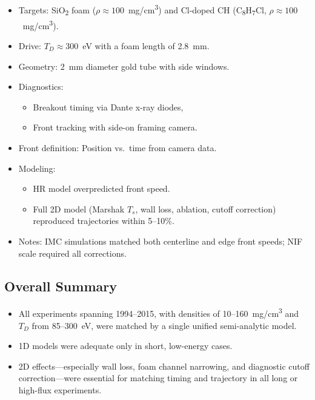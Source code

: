 \documentclass{article}
\begin{document}
\begin{itemize}
    \item Targets: SiO\textsubscript{2} foam ($\rho \approx 100$~mg/cm\textsuperscript{3}) and Cl-doped CH (C\textsubscript{8}H\textsubscript{7}Cl, $\rho \approx 100$~mg/cm\textsuperscript{3}).
    \item Drive: $T_D \approx 300$~eV with a foam length of 2.8~mm.
    \item Geometry: 2~mm diameter gold tube with side windows.
    \item Diagnostics:
    \begin{itemize}
        \item Breakout timing via Dante x-ray diodes,
        \item Front tracking with side-on framing camera.
    \end{itemize}
    \item Front definition: Position vs.\ time from camera data.
    \item Modeling:
    \begin{itemize}
        \item HR model overpredicted front speed.
        \item Full 2D model (Marshak $T_s$, wall loss, ablation, cutoff correction) reproduced trajectories within 5--10\%.
    \end{itemize}
    \item Notes: IMC simulations matched both centerline and edge front speeds; NIF scale required all corrections.
\end{itemize}

\subsection*{Overall Summary}

\begin{itemize}
    \item All experiments spanning 1994--2015, with densities of 10--160~mg/cm\textsuperscript{3} and $T_D$ from 85--300~eV, were matched by a single unified semi-analytic model.
    \item 1D models were adequate only in short, low-energy cases.
    \item 2D effects—especially wall loss, foam channel narrowing, and diagnostic cutoff correction—were essential for matching timing and trajectory in all long or high-flux experiments.
\end{itemize}
\end{document}
